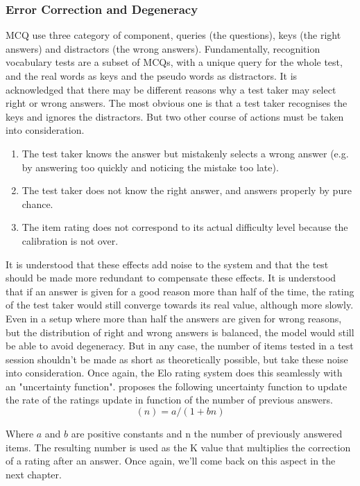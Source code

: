         \subsubsection{Error Correction and Degeneracy}
MCQ use three category of component, queries (the questions), keys (the right answers) and distractors (the wrong answers). Fundamentally, recognition vocabulary tests are a subset of MCQs, with a unique query for the whole test, and the real words as keys and the pseudo words as distractors. It is acknowledged that there may be different reasons why a test taker may select right or wrong answers. The most obvious one is that a test taker recognises the keys and ignores the distractors. But two other course of actions must be taken into consideration.
\begin{enumerate}
    \item The test taker knows the answer but mistakenly selects a wrong answer (e.g. by answering too quickly and noticing the mistake too late).
    \item The test taker does not know the right answer, and answers properly by pure chance.
    \item The item rating does not correspond to its actual difficulty level because the calibration is not over.
\end{enumerate}
It is understood that these effects add noise to the system and that the test should be made more redundant to compensate these effects. It is understood that if an answer is given for a good reason more than half of the time, the rating of the test taker would still converge towards its real value, although more slowly. Even in a setup where more than half the answers are given for wrong reasons, but the distribution of right and wrong answers is balanced, the model would still be able to avoid degeneracy. But in any case, the number of items tested in a test session shouldn't be made as short as theoretically possible, but take these noise into consideration. Once again, the Elo rating system does this seamlessly with an "uncertainty function". \cite{pelanek_applications_2016} proposes the following uncertainty function to update the rate of the ratings update in function of the number of previous answers.
\begin{equation}
    (n)=a/(1 + bn)
    \label{uncertainty-function}
\end{equation}

Where $a$ and $b$ are positive constants and n the number of previously answered items. The resulting number is used as the K value that multiplies the correction of a rating after an answer. Once again, we'll come back on this aspect in the next chapter.

